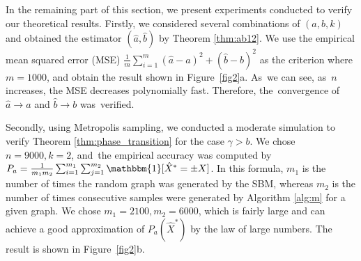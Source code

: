 \documentclass[entropy,article,accept,moreauthors,pdftex]{Definitions/mdpi}
\newcommand{\1}{\mathbbm{1}}
\begin{document}
\begin{paracol}{2}
In the remaining part of this section, we present  experiments conducted to verify our theoretical results.
Firstly, we considered several combinations of $(a,b,k)$ and obtained the estimator $(\hat{a}, \hat{b})$ by Theorem \ref{thm:ab12}.
We use
the empirical mean squared error (MSE) $\frac{1}{m} \sum_{i=1}^m (\hat{a}-a)^2 + (\hat{b}-b)^2$ as the criterion
where $m=1000$, and obtain the result shown in Figure~\ref{fig2}a. As~we can see, as~$n$ increases, the MSE decreases polynomially fast. Therefore, the~convergence
of $\hat{a} \to a$ and $\hat{b} \to b$ was~verified.

Secondly, using Metropolis sampling, we conducted a moderate simulation to verify Theorem \ref{thm:phase_transition} for the case $\gamma > b$.
We chose $n=9000, k=2$, and~the empirical accuracy was computed by $P_a = \frac{1}{m_1m_2}\sum_{i=1}^{m_1} \sum_{j=1}^{m_2} \mathbbm{1}[\hat{X}^* = \pm X]$.
In this formula, $m_1$ is the number of times   the random graph was generated by the SBM,
whereas $m_2$ is the number of times  consecutive samples were generated by Algorithm \ref{alg:m} for a given graph.
We chose $m_1=2100,m_2=6000$, which is fairly large and can achieve a good approximation of $P_a(\hat{X}^*)$ by the law of large numbers.
The result is shown in Figure~\ref{fig2}b.
\end{paracol}
\nointerlineskip
\end{document}
